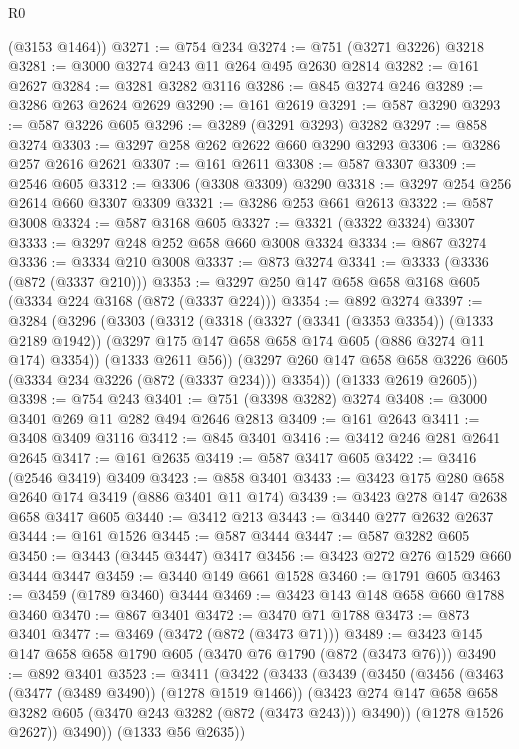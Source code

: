 \begin{lexlean}{R0}
\begin{coremodule}
      (@3153 @1464))
@3271 := @754 @234
@3274 := @751 (@3271 @3226) @3218
@3281 := @3000 @3274 @243 @11 @264 @495 @2630 @2814
@3282 := @161 @2627
@3284 := @3281 @3282 @3116
@3286 := @845 @3274 @246
@3289 := @3286 @263 @2624 @2629
@3290 := @161 @2619
@3291 := @587 @3290
@3293 := @587 @3226 @605
@3296 := @3289 (@3291 @3293) @3282
@3297 := @858 @3274
@3303 := @3297 @258 @262 @2622 @660 @3290 @3293
@3306 := @3286 @257 @2616 @2621
@3307 := @161 @2611
@3308 := @587 @3307
@3309 := @2546 @605
@3312 := @3306 (@3308 @3309) @3290
@3318 := @3297 @254 @256 @2614 @660 @3307 @3309
@3321 := @3286 @253 @661 @2613
@3322 := @587 @3008
@3324 := @587 @3168 @605
@3327 := @3321 (@3322 @3324) @3307
@3333 := @3297 @248 @252 @658 @660 @3008 @3324
@3334 := @867 @3274
@3336 := @3334 @210 @3008
@3337 := @873 @3274
@3341 := @3333 (@3336 (@872 (@3337 @210)))
@3353 := @3297 @250 @147 @658 @658 @3168 @605 (@3334 @224 @3168 (@872 (@3337 @224)))
@3354 := @892 @3274
@3397 := @3284
    (@3296
      (@3303
        (@3312
          (@3318
            (@3327 (@3341 (@3353 @3354)) (@1333 @2189 @1942))
            (@3297 @175 @147 @658 @658 @174 @605 (@886 @3274 @11 @174) @3354))
          (@1333 @2611 @56))
        (@3297 @260 @147 @658 @658 @3226 @605 (@3334 @234 @3226 (@872 (@3337 @234))) @3354))
      (@1333 @2619 @2605))
@3398 := @754 @243
@3401 := @751 (@3398 @3282) @3274
@3408 := @3000 @3401 @269 @11 @282 @494 @2646 @2813
@3409 := @161 @2643
@3411 := @3408 @3409 @3116
@3412 := @845 @3401
@3416 := @3412 @246 @281 @2641 @2645
@3417 := @161 @2635
@3419 := @587 @3417 @605
@3422 := @3416 (@2546 @3419) @3409
@3423 := @858 @3401
@3433 := @3423 @175 @280 @658 @2640 @174 @3419 (@886 @3401 @11 @174)
@3439 := @3423 @278 @147 @2638 @658 @3417 @605
@3440 := @3412 @213
@3443 := @3440 @277 @2632 @2637
@3444 := @161 @1526
@3445 := @587 @3444
@3447 := @587 @3282 @605
@3450 := @3443 (@3445 @3447) @3417
@3456 := @3423 @272 @276 @1529 @660 @3444 @3447
@3459 := @3440 @149 @661 @1528
@3460 := @1791 @605
@3463 := @3459 (@1789 @3460) @3444
@3469 := @3423 @143 @148 @658 @660 @1788 @3460
@3470 := @867 @3401
@3472 := @3470 @71 @1788
@3473 := @873 @3401
@3477 := @3469 (@3472 (@872 (@3473 @71)))
@3489 := @3423 @145 @147 @658 @658 @1790 @605 (@3470 @76 @1790 (@872 (@3473 @76)))
@3490 := @892 @3401
@3523 := @3411
    (@3422
      (@3433
        (@3439
          (@3450
            (@3456
              (@3463 (@3477 (@3489 @3490)) (@1278 @1519 @1466))
              (@3423 @274 @147 @658 @658 @3282 @605 (@3470 @243 @3282 (@872 (@3473 @243))) @3490))
            (@1278 @1526 @2627))
          @3490))
      (@1333 @56 @2635))

\end{coremodule}
\end{lexlean}
